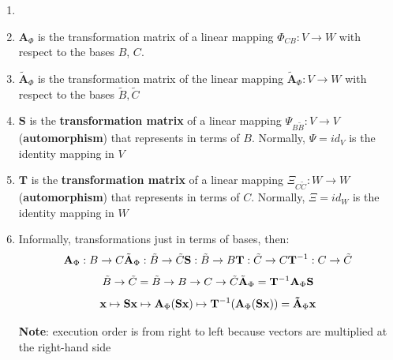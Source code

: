 \begin{enumerate}
    \begin{enumerate}
        \item[] 

        \item $\mathbf{A}_\Phi$ is the transformation matrix of a linear mapping $\Phi_{CB} : V \to W$ with respect to the bases $B$, $C$.

        \item $\tilde{\mathbf{A}}_\Phi$ is the transformation matrix of the linear mapping $\tilde{\mathbf{A}}_\Phi : V \to W$ with respect to the bases $\tilde{B}, \tilde{C}$ 

        \item $\mathbf{S}$ is the \textbf{transformation matrix} of a linear mapping $\Psi_{B\tilde{B}} : V \to V$ (\textbf{automorphism}) that represents  in terms of $B$. Normally, $\Psi = id_V$ is the identity mapping in $V$

        \item $\mathbf{T}$ is the \textbf{transformation matrix} of a linear mapping $\Xi_{C\tilde{C}} : W \to W$ (\textbf{automorphism}) that represents  in terms of $C$. Normally, $\Xi = id_W$ is the identity mapping in $W$

        \item Informally, transformations just in terms of bases, then:
        \[
            \hfill
            \mathbf{A}_\Phi : B \to C
            \hfill
            \tilde{\mathbf{A}}_\Phi : \tilde{B} \to \tilde{C}
            \hfill
            \mathbf{S} : \tilde{B} \to B
            \hfill
            \mathbf{T} : \tilde{C}  \to C
            \hfill
            \mathbf{T}^{-1}: C \to \tilde{C}
            \hfill
        \]
        \[
            \hfill
            \tilde{B} \to \tilde{C}
            =
            \tilde{B} \to B \to C \to \tilde{C}
            \hfill 
            \tilde{\mathbf{A}}_\Phi = \mathbf{T}^{-1}\mathbf{A}_\Phi \mathbf{S}
            \hfill
        \]
        \[
            \hfill
            \mathbf{x} 
            \mapsto \mathbf{Sx}
            \mapsto \mathbf{A}_\Phi(\mathbf{Sx})
            \mapsto \mathbf{T}^{-1}(\mathbf{A}_\Phi(\mathbf{Sx}))
            = \mathbf{\tilde{A}}_\Phi \mathbf{x}
            \hfill
        \]

        \textbf{Note}: execution order is from right to left because vectors are multiplied at the right-hand side 
        
    \end{enumerate}
    
\end{enumerate}



